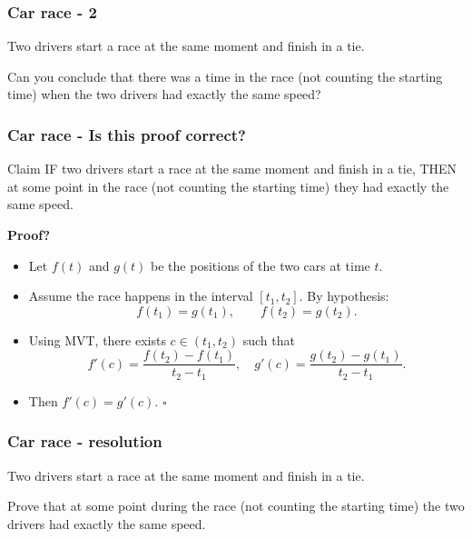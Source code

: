 \documentclass[14pt]{beamer}
\newcommand{\setsize}[1]{\fontsize{#1}{#1}\selectfont} %
\newcommand{\smallerfont}{\setsize{13}} %
\begin{document}
	\begin{frame}[t]
		\smallerfont
		\frametitle{Car race - 2}

		Two drivers start a race at the same moment and finish in a tie.

		\medskip
		Can you conclude that there was a time in the race (not counting the starting
		time) when the two drivers had exactly the same speed?
	\end{frame}
	\begin{frame}[t]
		\smallerfont
		\frametitle{Car race - Is this proof correct?}

		\begin{block}{\smallerfont Claim}
			IF two drivers start a race at the same moment and finish in a tie, THEN
			at some point in the race (not counting the starting time) they had
			exactly the same speed.
		\end{block}

		{\bf Proof?}
		\begin{itemize}
			\item Let $f(t)$ and $g(t)$ be the positions of the two cars at time $t$.

			\item Assume the race happens in the interval $[t_{1},t_{2}]$. By
				hypothesis:
				\[
					f(t_{1}) = g(t_{1}), \quad \quad f(t_{2}) = g(t_{2}).
				\]

			\item Using MVT, there exists $c \in (t_{1}, t_{2})$ such that
				\[
					f'(c) = \frac{f(t_{2}) - f(t_{1})}{t_{2}- t_{1}}, \quad g'(c) = \frac{g(t_{2})
					- g(t_{1})}{t_{2}- t_{1}}.
				\]

			\item Then $f'(c) = g'(c)$. \hfill $\square$
		\end{itemize}
	\end{frame}

	\begin{frame}[t]
		\smallerfont
		\frametitle{Car race - resolution}

		Two drivers start a race at the same moment and finish in a tie.

		\medskip
		Prove that at some point during the race (not counting the starting time)
		the two drivers had exactly the same speed.
	\end{frame}
\end{document}
